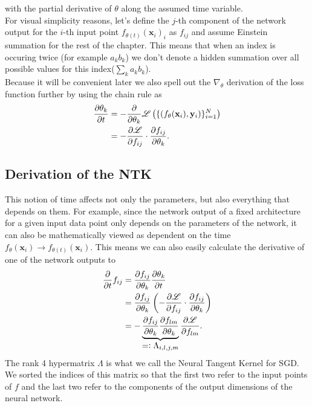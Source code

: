 with the partial derivative of $\theta$ along the assumed time variable.\\
For visual simplicity reasons, let's define the $j$-th component of the network output for the $i$-th input point $f_{\theta(t)}(\mathbf{x}_i)_i$ as $f_{ij}$ and assume Einstein summation for the rest of the chapter. This means that when an index is occuring twice (for example $a_k b_k$) we don't denote a hidden summation over all possible values for this index($\sum_k a_kb_k$).\\ 
Because it will be convenient later we also spell out the $\nabla_\theta$ derivation of the loss function further by using the chain rule as
\begin{align}
	\frac{\partial\theta_k}{\partial t} &= - \frac{\partial}{\partial\theta_k}\mathscr{L}\left( \{(f_\theta(\mathbf{x}_i), \mathbf{y}_i)\}_{i=1}^{N} \right)\nonumber\\
	&= - \frac{\partial\mathscr{L}}{\partial f_{ij}} \cdot \frac{\partial f_{ij}}{\partial\theta_k}.
\end{align} 

\subsection{Derivation of the NTK}
This notion of time affects not only the parameters, but also everything that depends on them. For example, since the network output of a fixed architecture for a given input data point only depends on the parameters of the network, it can also be mathematically viewed as dependent on the time $f_{\theta}(\mathbf{x}_i) \rightarrow f_{\theta(t)}(\mathbf{x}_i)$. This means we can also easily calculate the derivative of one of the network outputs to
\begin{align}
	\pAbl{}{t} f_{ij} &= \pAbl{f_{ij}}{\theta_k}\pAbl{\theta_k}{t}\nonumber\\
	&= \pAbl{f_{ij}}{\theta_k} \left(- \pAbl{\mathscr{L}}{f_{ij}} \cdot \pAbl{f_{ij}}{\theta_k} \right)\\
	&= - \underbrace{\pAbl{f_{ij}}{\theta_k} \pAbl{f_{lm}}{\theta_k}}_\mathlarger{=\vcentcolon \Lambda_{i,l,j,m}}
	\pAbl{\mathscr{L}}{f_{lm}}.\nonumber
\end{align}
The rank 4 hypermatrix $\Lambda$ is what we call the Neural Tangent Kernel for SGD. We sorted the indices of this matrix so that the first two refer to the input points of $f$ and the last two refer to the components of the output dimensions of the neural network.